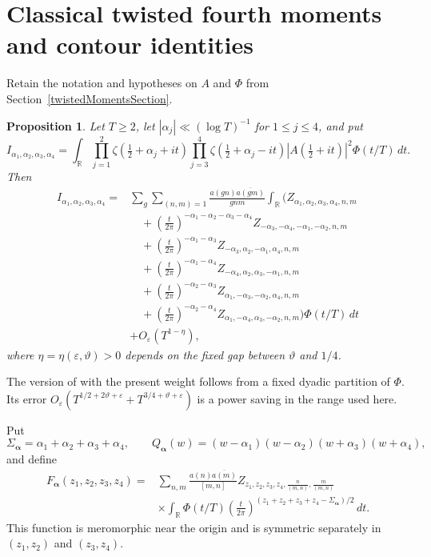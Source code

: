 \documentclass[oneside, 12pt]{amsart}
\newtheorem{prop}[thm]{Proposition}
\theoremstyle{definition}
\begin{document}
	{\section{Classical twisted fourth moments and contour identities}\label{appendixClassicalTwistedMoments}}
	{
		Retain the notation and hypotheses on $A$ and $\Phi$ from
		Section~\ref{twistedMomentsSection}.
		\begin{prop}\label{bblrFourthMoment}\textup{\cite[Theorem~1.1]{BettinBuiLiRadziwill}}
			Let $T\geq2$, let $|\alpha_j|\ll(\log T)^{-1}$ for
			$1\leq j\leq4$, and put
			\[
			I_{\alpha_1,\alpha_2,\alpha_3,\alpha_4}
			=\int_{\mathbb R}\prod_{j=1}^{2}
			\zeta(\tfrac12+\alpha_j+it)
			\prod_{j=3}^{4}\zeta(\tfrac12+\alpha_j-it)
			|A(\tfrac12+it)|^2\Phi(t/T)\,dt.
			\]
			Then
			\begin{align*}
				I_{\alpha_1,\alpha_2,\alpha_3,\alpha_4}
				={}&\sum_g\sum_{(n,m)=1}
				\frac{a(gn)\overline{a(gm)}}{gnm}
				\int_{\mathbb R}\Bigg(
				Z_{\alpha_1,\alpha_2,\alpha_3,\alpha_4,n,m}\\
				&\quad+\left(\frac t{2\pi}\right)^{-\alpha_1-\alpha_2-\alpha_3-\alpha_4}
				Z_{-\alpha_3,-\alpha_4,-\alpha_1,-\alpha_2,n,m}\\
				&\quad+\left(\frac t{2\pi}\right)^{-\alpha_1-\alpha_3}
				Z_{-\alpha_3,\alpha_2,-\alpha_1,\alpha_4,n,m}\\
				&\quad+\left(\frac t{2\pi}\right)^{-\alpha_1-\alpha_4}
				Z_{-\alpha_4,\alpha_2,\alpha_3,-\alpha_1,n,m}\\
				&\quad+\left(\frac t{2\pi}\right)^{-\alpha_2-\alpha_3}
				Z_{\alpha_1,-\alpha_3,-\alpha_2,\alpha_4,n,m}\\
				&\quad+\left(\frac t{2\pi}\right)^{-\alpha_2-\alpha_4}
				Z_{\alpha_1,-\alpha_4,\alpha_3,-\alpha_2,n,m}
				\Bigg)\Phi(t/T)\,dt\\
				&+O_\varepsilon(T^{1-\eta}),
			\end{align*}
			where $\eta=\eta(\varepsilon,\vartheta)>0$ depends on the fixed gap
			between $\vartheta$ and $1/4$.
		\end{prop}
		
		The version of \cite[Theorem~1.1]{BettinBuiLiRadziwill} with the present
		weight follows from a fixed dyadic partition of $\Phi$.  Its error
		$O_\varepsilon(T^{1/2+2\vartheta+\varepsilon}
		+T^{3/4+\vartheta+\varepsilon})$ is a power saving in the range used
		here.
		
		Put
		\[
		\Sigma_{\boldsymbol\alpha}=\alpha_1+\alpha_2+\alpha_3+\alpha_4,
		\qquad
		Q_{\boldsymbol\alpha}(w)
		=(w-\alpha_1)(w-\alpha_2)(w+\alpha_3)(w+\alpha_4),
		\]
		and define
		\begin{align*}
			F_{\boldsymbol\alpha}(z_1,z_2,z_3,z_4)
			={}&\sum_{n,m}\frac{a(n)\overline{a(m)}}{[m,n]}
			Z_{z_1,z_2,z_3,z_4,\frac n{(m,n)},\frac m{(m,n)}}\\
			&\times\int_{\mathbb R}\Phi(t/T)
			\left(\frac t{2\pi}\right)^{
				(z_1+z_2+z_3+z_4-\Sigma_{\boldsymbol\alpha})/2}\,dt.
		\end{align*}
		This function is meromorphic near the origin and is symmetric separately
		in $(z_1,z_2)$ and $(z_3,z_4)$.
		
}
\end{document}
